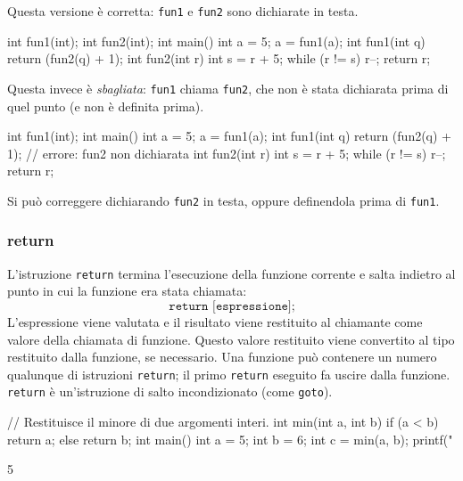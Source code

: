 \documentclass[11pt,a4paper]{article}
\begin{document}
\begin{esempio}
Questa versione è corretta: \lstinline|fun1| e \lstinline|fun2| sono dichiarate in testa.
\begin{codice}
int fun1(int);
int fun2(int);
int main() {
    int a = 5;
    a = fun1(a);
}
int fun1(int q) {
    return (fun2(q) + 1);
}
int fun2(int r) {
    int s = r + 5;
    while (r != s)
        r--;
    return r;
}
\end{codice}
Questa invece è \emph{sbagliata}: \lstinline|fun1| chiama \lstinline|fun2|, che non è stata dichiarata prima di quel punto (e non è definita prima).
\begin{codice}
int fun1(int);
int main() {
    int a = 5;
    a = fun1(a);
}
int fun1(int q) {
    return (fun2(q) + 1);   // errore: fun2 non dichiarata
}
int fun2(int r) {
    int s = r + 5;
    while (r != s)
        r--;
    return r;
}
\end{codice}
Si può correggere dichiarando \lstinline|fun2| in testa, oppure definendola prima di \lstinline|fun1|.
\end{esempio}

\subsubsection{return}

L'istruzione \lstinline|return| termina l'esecuzione della funzione corrente e salta indietro al punto in cui la funzione era stata chiamata:
\[
\texttt{return [espressione];}
\]
L'espressione viene valutata e il risultato viene restituito al chiamante come valore della chiamata di funzione. Questo valore restituito viene convertito al tipo restituito dalla funzione, se necessario. Una funzione può contenere un numero qualunque di istruzioni \lstinline|return|; il primo \lstinline|return| eseguito fa uscire dalla funzione. \lstinline|return| è un'istruzione di salto incondizionato (come \lstinline|goto|).

\begin{esempio}
\begin{codice}
// Restituisce il minore di due argomenti interi.
int min(int a, int b)
{
    if (a < b)
        return a;
    else
        return b;
}
int main()
{
    int a = 5;
    int b = 6;
    int c = min(a, b);
    printf("%
}
\end{codice}
\begin{risultato}
5
\end{risultato}
\end{esempio}
\end{document}
